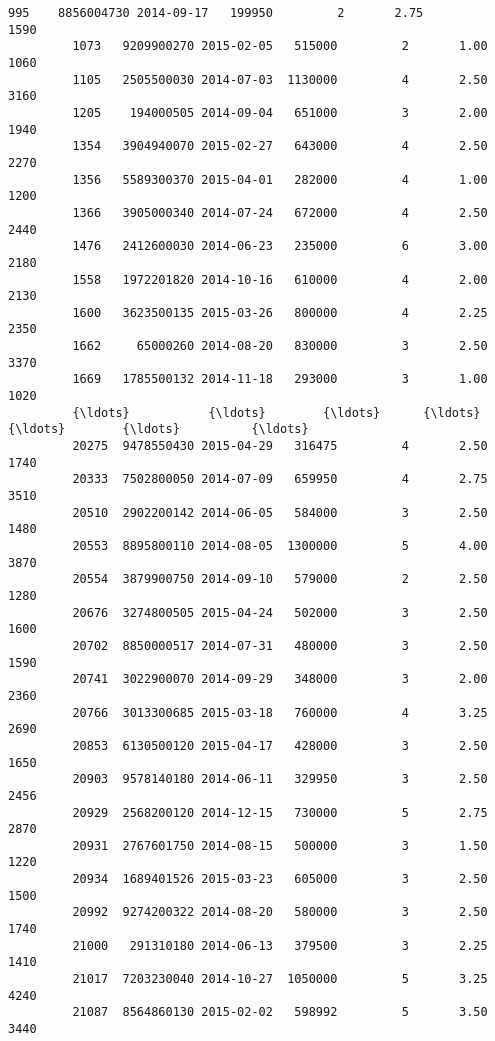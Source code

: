 \documentclass[11pt]{article}
\begin{document}
\begin{Verbatim}[commandchars=\\\{\}]
         995    8856004730 2014-09-17   199950         2       2.75         1590   
         1073   9209900270 2015-02-05   515000         2       1.00         1060   
         1105   2505500030 2014-07-03  1130000         4       2.50         3160   
         1205    194000505 2014-09-04   651000         3       2.00         1940   
         1354   3904940070 2015-02-27   643000         4       2.50         2270   
         1356   5589300370 2015-04-01   282000         4       1.00         1200   
         1366   3905000340 2014-07-24   672000         4       2.50         2440   
         1476   2412600030 2014-06-23   235000         6       3.00         2180   
         1558   1972201820 2014-10-16   610000         4       2.00         2130   
         1600   3623500135 2015-03-26   800000         4       2.25         2350   
         1662     65000260 2014-08-20   830000         3       2.50         3370   
         1669   1785500132 2014-11-18   293000         3       1.00         1020   
         {\ldots}           {\ldots}        {\ldots}      {\ldots}       {\ldots}        {\ldots}          {\ldots}   
         20275  9478550430 2015-04-29   316475         4       2.50         1740   
         20333  7502800050 2014-07-09   659950         4       2.75         3510   
         20510  2902200142 2014-06-05   584000         3       2.50         1480   
         20553  8895800110 2014-08-05  1300000         5       4.00         3870   
         20554  3879900750 2014-09-10   579000         2       2.50         1280   
         20676  3274800505 2015-04-24   502000         3       2.50         1600   
         20702  8850000517 2014-07-31   480000         3       2.50         1590   
         20741  3022900070 2014-09-29   348000         3       2.00         2360   
         20766  3013300685 2015-03-18   760000         4       3.25         2690   
         20853  6130500120 2015-04-17   428000         3       2.50         1650   
         20903  9578140180 2014-06-11   329950         3       2.50         2456   
         20929  2568200120 2014-12-15   730000         5       2.75         2870   
         20931  2767601750 2014-08-15   500000         3       1.50         1220   
         20934  1689401526 2015-03-23   605000         3       2.50         1500   
         20992  9274200322 2014-08-20   580000         3       2.50         1740   
         21000   291310180 2014-06-13   379500         3       2.25         1410   
         21017  7203230040 2014-10-27  1050000         5       3.25         4240   
         21087  8564860130 2015-02-02   598992         5       3.50         3440   

\end{Verbatim}
\end{document}
